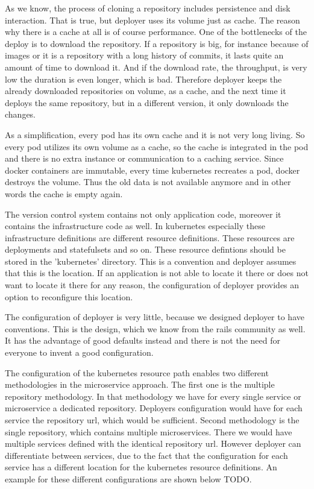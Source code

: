 As we know, the process of cloning a repository includes persistence and disk
interaction. That is true, but deployer uses its volume just as cache. The reason why
there is a cache at all is of course performance. One of the bottlenecks of the deploy is
to download the repository. If a repository is big, for instance because of images or it
is a repository with a long history of commits, it lasts quite an amount of time to
download it. And if the download rate, the throughput, is very low the duration is even
longer, which is bad. Therefore deployer keeps the already downloaded repositories on
volume, as a cache, and the next time it deploys the same repository, but in a different
version, it only downloads the changes.

As a simplification, every pod has its own cache and it is not very long living. So every
pod utilizes its own volume as a cache, so the cache is integrated in the pod and there is
no extra instance or communication to a caching service. Since docker containers are
immutable, every time kubernetes recreates a pod, docker destroys the volume. Thus the old
data is not available anymore and in other words the cache is empty again.

The version control system contains not only application code, moreover it contains the
infrastructure code as well. In kubernetes especially these infrastructure definitions are
different resource definitions. These resources are deployments and statefulsets and so
on. These resource defintions should be stored in the 'kubernetes' directory. This is a
convention and deployer assumes that this is the location. If an application is not able
to locate it there or does not want to locate it there for any reason, the configuration
of deployer provides an option to reconfigure this location.

The configuration of deployer is very little, because we designed deployer to have
conventions. This is the design, which we know from the rails community as well. It has
the advantage of good defaults instead and there is not the need for everyone to invent a
good configuration.

The configuration of the kubernetes resource path enables two different methodologies in
the microservice approach. The first one is the multiple repository methodology. In that
methodology we have for every single service or microservice a dedicated repository.
Deployers configuration would have for each service the repository url, which would be
sufficient. Second methodology is the single repository, which contains multiple
microservices. There we would have multiple services defined with the identical repository
url. However deployer can differentiate between services, due to the fact that the
configuration for each service has a different location for the kubernetes resource
definitions. An example for these different configurations are shown below TODO.

